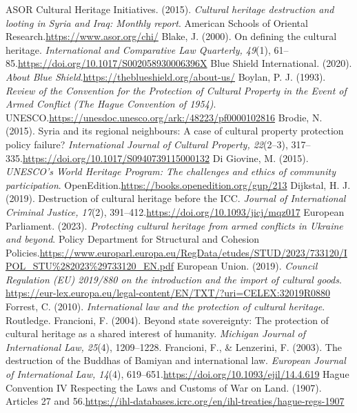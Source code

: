 
\begin{referencelist}
   ASOR Cultural Heritage Initiatives. (2015). \emph{Cultural heritage destruction and looting in Syria and Iraq: Monthly report}. American Schools of Oriental Research.\url{https://www.asor.org/chi/}
   Blake, J. (2000). On defining the cultural heritage. \emph{International and Comparative Law Quarterly, 49}(1), 61–85.\url{https://doi.org/10.1017/S002058930006396X}
   Blue Shield International. (2020). \emph{About Blue Shield}.\url{https://theblueshield.org/about-us/}
   Boylan, P. J. (1993). \emph{Review of the Convention for the Protection of Cultural Property in the Event of Armed Conflict (The Hague Convention of 1954)}. UNESCO.\url{https://unesdoc.unesco.org/ark:/48223/pf0000102816}
   Brodie, N. (2015). Syria and its regional neighbours: A case of cultural property protection policy failure? \emph{International Journal of Cultural Property, 22}(2–3), 317–335.\url{https://doi.org/10.1017/S0940739115000132}
   Di Giovine, M. (2015). \emph{UNESCO's World Heritage Program: The challenges and ethics of community participation}. OpenEdition.\url{https://books.openedition.org/gup/213}
   Dijkstal, H. J. (2019). Destruction of cultural heritage before the ICC. \emph{Journal of International Criminal Justice, 17}(2), 391–412.\url{https://doi.org/10.1093/jicj/mqz017}
   European Parliament. (2023). \emph{Protecting cultural heritage from armed conflicts in Ukraine and beyond}. Policy Department for Structural and Cohesion Policies.\url{https://www.europarl.europa.eu/RegData/etudes/STUD/2023/733120/IPOL_STU\%282023\%29733120_EN.pdf}
   European Union. (2019). \emph{Council Regulation (EU) 2019/880 on the introduction and the import of cultural goods}. \url{https://eur-lex.europa.eu/legal-content/EN/TXT/?uri=CELEX:32019R0880}
   Forrest, C. (2010). \emph{International law and the protection of cultural heritage}. Routledge.
   Francioni, F. (2004). Beyond state sovereignty: The protection of cultural heritage as a shared interest of humanity. \emph{Michigan Journal of International Law, 25}(4), 1209–1228.
   Francioni, F., \& Lenzerini, F. (2003). The destruction of the Buddhas of Bamiyan and international law. \emph{European Journal of International Law, 14}(4), 619–651.\url{https://doi.org/10.1093/ejil/14.4.619}
   Hague Convention IV Respecting the Laws and Customs of War on Land. (1907). Articles 27 and 56.\url{https://ihl-databases.icrc.org/en/ihl-treaties/hague-regs-1907}

\end{referencelist}
